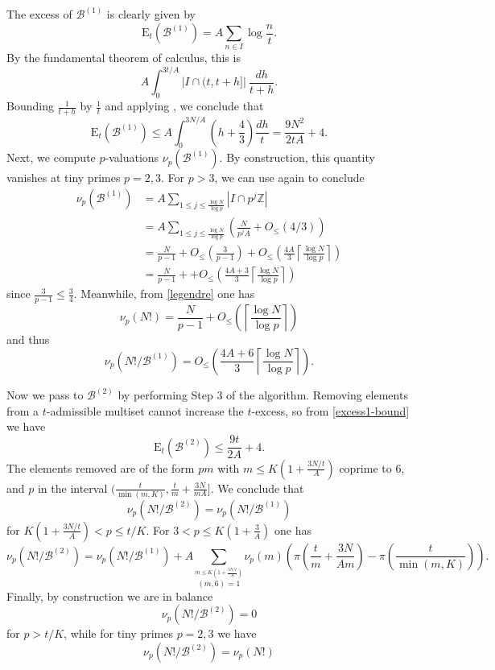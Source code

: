 \documentclass[12pt,a4paper,reqno]{amsart}
\numberwithin{equation}{section}
\theoremstyle{plain}
\theoremstyle{definition}
\newcommand\Z{\mathbb{Z}}
\newcommand\tuple{{\mathcal B}}
\newcommand\excess{{\mathrm{E}}}
\begin{document}
The excess of $\tuple^{(1)}$ is clearly given by
$$ \excess_t(\tuple^{(1)}) = A \sum_{n \in I} \log \frac{n}{t}.$$
By the fundamental theorem of calculus, this is
$$ A \int_0^{3t/A} |I \cap (t, t+h]|\ \frac{dh}{t+h}.$$
Bounding $\frac{1}{t+h}$ by $\frac{1}{t}$ and applying , we conclude that
\begin{equation}\label{excess1-bound}
 \excess_t(\tuple^{(1)}) \leq A \int_0^{3N/A} \left(h + \frac{4}{3}\right) \frac{dh}{t} = \frac{9N^2}{2tA} + 4.
\end{equation}
Next, we compute $p$-valuations $\nu_p(\tuple^{(1)})$.  By construction, this quantity vanishes at tiny primes $p=2,3$.  For $p>3$, we can use  again to conclude
\begin{align*}
  \nu_p(\tuple^{(1)}) &= A \sum_{1 \leq j \leq \frac{\log N}{\log p}} |I \cap p^j \Z| \\
  &= A \sum_{1 \leq j \leq \frac{\log N}{\log p}} \left(\frac{N}{p^j A} + O_{\leq}(4/3)\right) \\
  &= \frac{N}{p-1} + O_{\leq}\left(\frac{3}{p-1}\right)
  + O_{\leq}\left(\frac{4A}{3} \left\lceil \frac{\log N}{\log p}  \right\rceil\right) \\
  &= \frac{N}{p-1} +
  + O_{\leq}\left(\frac{4A+3}{3} \left\lceil \frac{\log N}{\log p}  \right\rceil\right) 
\end{align*}
since $\frac{3}{p-1} \leq \frac{3}{4}$.
Meanwhile, from \eqref{legendre} one has
$$ \nu_p(N!) = \frac{N}{p-1} + O_{\leq}\left(\left\lceil \frac{\log N}{\log p}  \right\rceil\right)$$
and thus
\begin{equation}\label{nup} 
  \nu_p(N!/\tuple^{(1)}) =  
O_{\leq}\left(\frac{4A+6}{3} \left\lceil \frac{\log N}{\log p}  \right\rceil\right).
\end{equation}

Now we pass to $\tuple^{(2)}$ by performing Step 3 of the algorithm.  Removing elements from a $t$-admissible multiset cannot increase the $t$-excess, so from \eqref{excess1-bound} we have
\begin{equation}\label{excess2-bound} 
  \excess_t(\tuple^{(2)}) \leq \frac{9t}{2A} + 4.
\end{equation}
The elements removed are of the form $pm$ with $m \leq K(1+\frac{3N/t}{A})$ coprime to $6$, and $p$ in the interval $(\frac{t}{\min(m,K)}, \frac{t}{m}+\frac{3N}{mA}]$.  We conclude that
\begin{equation}\label{nup-21}
   \nu_p( N!/\tuple^{(2)} ) = \nu_p( N!/\tuple^{(1)})
\end{equation}
for $K(1+\frac{3N/t}{A}) < p \leq t/K$.  For $3 < p \leq K(1+\frac{3}{A})$ one has
\begin{equation}\label{nup-2}
 \nu_p( N!/\tuple^{(2)} ) = \nu_p(N!/\tuple^{(1)}) + A \sum_{\stackrel{m \leq K(1+\frac{3N/t}{A})}{(m,6)=1}} \nu_p(m) \left(\pi\left(\frac{t}{m}+\frac{3N}{Am}\right)
- \pi\left(\frac{t}{\min(m,K)}\right) \right).
\end{equation}
Finally, by construction we are in balance
$$ \nu_p(N!/\tuple^{(2)}) = 0$$
for $p>t/K$, while for tiny primes $p=2,3$ we have
$$ \nu_p(N!/\tuple^{(2)}) = \nu_p(N!)$$
\end{document}
